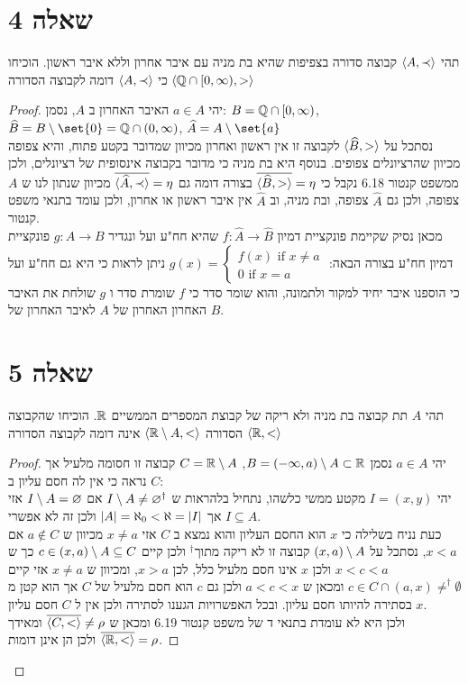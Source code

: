\documentclass{article}
\DeclarePairedDelimiter\set\{\}
\begin{document}
	\section*{שאלה 4}
	תהי $\langle A, \prec \rangle$ קבוצה סדורה בצפיפות שהיא בת מניה עם איבר אחרון וללא איבר ראשון.
	הוכיחו כי $\langle A, \prec \rangle$ דומה לקבוצה הסדורה $\langle \mathbb{Q} \cap [0, \infty), > \rangle$
	\begin{proof}
		 יהי $a \in A$ האיבר האחרון ב $A$, נסמן:
		 $B = \mathbb{Q} \cap [0, \infty)$, $\widehat{B} = B \sub \set{0} = \QQ \cap (0, \infty)$, $\widehat{A} = A \sub \set{a}$ \\
		 נסתכל על $\langle \widehat{B}, > \rangle$ לקבוצה זו אין ראשון ואחרון מכיוון שמדובר בקטע פתוח, והיא צפופה מכיוון שהרציונלים צפופים. בנוסף היא בת מניה כי מדובר בקבוצה אינסופית של רציונלים, ולכן ממשפט קנטור 6.18 נקבל כי $\overline{\langle \widehat{B}, > \rangle} = \eta$
		 בצורה דומה גם $\overline{\langle \widehat{A}, \prec \rangle}=\eta$ מכיוון שנתון לנו ש $A$ צפופה, ולכן גם $\widehat{A}$ צפופה, ובת מניה, וב $\widehat{A}$ אין איבר ראשון או אחרון, ולכן עומד בתנאי משפט קנטור. \\
		 מכאן נסיק שקיימת פונקציית דמיון $f: \widehat{A} \rightarrow \widehat{B}$ שהיא חח"ע ועל ונגדיר $g: A \rightarrow B$ פונקציית דמיון חח"ע בצורה הבאה:
		 $g(x) = \begin{cases}
			f(x) \text{ if } x \neq a \\
			0 \text{ if } x = a
		 \end{cases}$
		  ניתן לראות כי היא גם חח"ע ועל כי הוספנו איבר יחיד למקור ולתמונה,
		  והוא שומר סדר כי $f$ שומרת סדר ו $g$ שולחת את האיבר האחרון האחרון של $A$ לאיבר האחרון של $B$.

		  \section*{שאלה 5}
		  תהי $A$ תת קבוצה בת מניה ולא ריקה של קבוצת המספרים הממשיים $\mathbb{R}$.
		  הוכיחו שהקבוצה הסדורה $\langle \mathbb{R} \setminus A, < \rangle$ אינה דומה לקבוצה הסדורה $\langle \mathbb{R}, < \rangle$

		  \begin{proof}
			יהי $a \in A$ נסמן $B = (-\infty, a) \setminus A \subset \mathbb{R}$, $C = \mathbb{R} \setminus A$ קבוצה זו חסומה מלעיל אך נראה כי אין לה חסם עליון ב $C$: \\
			יהי $I = (x, y)$ מקטע ממשי כלשהו, נתחיל בלהראות ש $I \setminus A \neq \varnothing^{\dagger}$ אם $I \setminus A = \varnothing$ אזי $I \subseteq A$ אך $\left| A \right| = \aleph_0 < \aleph = \left| I \right|$ ולכן זה לא אפשרי. \\
			כעת נניח בשלילה כי $x$ הוא החסם העליון והוא נמצא ב $C$ אזי $x \neq a$ מכיוון ש $a \not\in C$
			אם $x < a$, נסתכל על $(x, a) \setminus A$ קבוצה זו לא ריקה מתוך$^{\dagger}$ ולכן קיים $c \in (x, a) \setminus A \subseteq C$ כך ש $x < c < a$ ולכן $x$ אינו חסם מלעיל כלל,
			לכן $x > a$, ומכיוון ש $x \neq a$ אזי קיים $c \in C \cap (a, x) \neq^{\dagger} \emptyset$ ומכאן ש $a < c < x$ ולכן גם $c$ הוא חסם מלעיל של $C$ אך הוא קטן מ $x$ בסתירה להיותו חסם עליון.
			ובכל האפשרויות הגענו לסתירה ולכן אין ל $C$ חסם עליון. \\
			ולכן היא לא עומדת בתנאי ד של משפט קנטור 6.19 ומכאן ש $\overline{\langle C, < \rangle} \neq \rho$ ומאידך $\overline{\langle \mathbb{R}, < \rangle} = \rho$ ולכן הן אינן דומות.
		  \end{proof}

	\end{proof}
\end{document}

